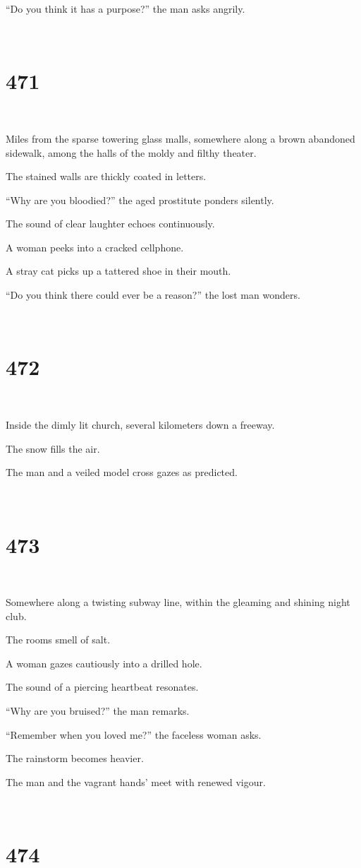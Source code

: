 \documentclass{report}
\begin{document}
``Do you think it has a purpose?'' the man asks angrily.

~
\chapter*{471}
~

Miles from the sparse towering glass malls, somewhere along a brown abandoned sidewalk, among the halls of the moldy and filthy theater.

The stained walls are thickly coated in letters.

``Why are you bloodied?'' the aged prostitute ponders silently.

The sound of clear laughter echoes continuously.

A woman peeks into a cracked cellphone.

A stray cat picks up a tattered shoe in their mouth.

``Do you think there could ever be a reason?'' the lost man wonders.

~
\chapter*{472}
~

Inside the dimly lit church, several kilometers down a freeway.

The snow fills the air.

The man and a veiled model cross gazes as predicted.

~
\chapter*{473}
~

Somewhere along a twisting subway line, within the gleaming and shining night club.

The rooms smell of salt.

A woman gazes cautiously into a drilled hole.

The sound of a piercing heartbeat resonates.

``Why are you bruised?'' the man remarks.

``Remember when you loved me?'' the faceless woman asks.

The rainstorm becomes heavier.

The man and the vagrant hands' meet with renewed vigour.

~
\chapter*{474}
~
\end{document}
